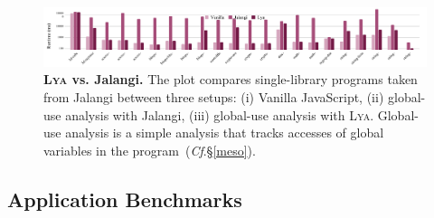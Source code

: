 \documentclass[letterpaper,twocolumn,10pt]{article}
\newcommand{\cf}[1]{(\emph{Cf}.\S\ref{#1})}
\newcommand{\sys}{{\scshape Lya}\xspace}
\begin{document}
\begin{figure}[t]
  \centering
   \includegraphics[width=\textwidth]{./figs/meso.pdf}
  \caption{
    \textbf{\sys vs. Jalangi.}
    The plot compares single-library programs taken from Jalangi between three setups:
		(i) Vanilla JavaScript, (ii) global-use analysis with Jalangi, (iii) global-use analysis with \sys.
    Global-use analysis is a simple analysis that tracks accesses of global variables in the program~\cf{meso}.
  }
  \label{fig:meso}
  \vspace{-3mm}
\end{figure}


\subsection{Application Benchmarks}
\label{macro}
\end{document}
